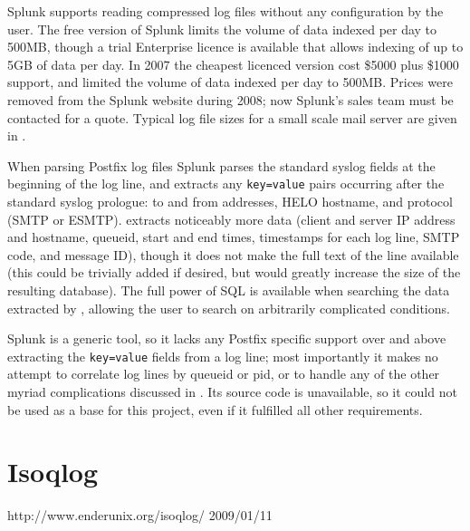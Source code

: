Splunk supports reading compressed log files without any configuration by
the user.  The free version of Splunk limits the volume of data indexed per
day to 500MB, though a trial Enterprise licence is available that allows
indexing of up to 5GB of data per day.  In 2007 the cheapest licenced
version cost \$5000 plus \$1000 support, and limited the volume of data
indexed per day to 500MB\@.  Prices were removed from the Splunk website
during 2008; now Splunk's sales team must be contacted for a quote.
Typical log file sizes for a small scale mail server are given in
.

When parsing Postfix log files Splunk parses the standard
syslog fields at the beginning of the log line, and extracts
any \texttt{key=value} pairs occurring after the standard syslog prologue:
to and from addresses, HELO hostname, and protocol (\gls{SMTP} or
\gls{ESMTP}).  \parsername{} extracts noticeably more data (client and
server \gls{IP} address and hostname, queueid, start and end times,
timestamps for each log line, \gls{SMTP} code, and message ID), though it
does not make the full text of the line available (this could be trivially
added if desired, but would greatly increase the size of the resulting
database).  The full power of \gls{SQL} is available when searching the
data extracted by \parsername{}, allowing the user to search on arbitrarily
complicated conditions.

Splunk is a generic tool, so it lacks any Postfix specific support over and
above extracting the \texttt{key=value} fields from a log line; most
importantly it makes no attempt to correlate log lines by queueid or
\gls{pid}, or to handle any of the other myriad complications discussed in
.  Its source code is unavailable, so it could
not be used as a base for this project, even if it fulfilled all other
requirements.

\section{Isoqlog}

{http://www.enderunix.org/isoqlog/}
{2009/01/11}


